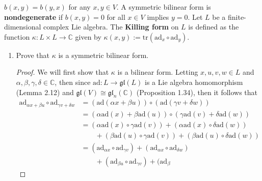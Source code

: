 \documentclass[12pt]{article}
\theoremstyle{definition}
\begin{document}
\begin{enumerate}
            $b(x, y)=b(y, x)$ for any $x, y\in V$. A symmetric bilinear form is
            \textbf{nondegenerate} if $b(x, y)=0$ for all $x\in V$ implies
            $y=0$. Let $L$ be a finite-dimensional complex Lie algebra. The
            \textbf{Killing form} on $L$ is defined as the function
            $\kappa:L\times L\to\mathbb{C}$ given by $\kappa(x,
            y):=\text{tr}(\text{ad}_x\circ\text{ad}_y)$.
            \begin{enumerate}[label=(\alph*)]
                \item Prove that $\kappa$ is a symmetric bilinear form.
                    \begin{proof}
                        We will first show that $\kappa$ is a bilinear form.
                        Letting $x, u, v, w\in L$ and $\alpha, \beta, \gamma,
                        \delta\in\mathbb{C}$, then since
                        $\text{ad}:L\to\mathfrak{gl}(L)$ is a Lie algebra
                        homomorphism (Lemma 2.12) and
                        $\mathfrak{gl}(V)\cong\mathfrak{gl}_n(\mathbb{C})$
                        (Proposition 1.34),
                        then it follows that
                        \begin{equation*}
                            \begin{split}
                                \text{ad}_{\alpha x+\beta
                                u}\circ\text{ad}_{\gamma v+\delta w}
                                &=(\text{ad}(\alpha x+\beta
                                u))\circ(\text{ad}(\gamma v+\delta w)) \\
                                &=(\alpha\text{ad}(x)+\beta\text{ad}(u))\circ(\gamma\text{ad}(v)+\delta\text{ad}(w))
                                \\
                                &=(\alpha\text{ad}(x)\circ\gamma\text{ad}(v))
                                +(\alpha\text{ad}(x)\circ\delta\text{ad}(w))\\&\quad\quad
                                +(\beta\text{ad}(u)\circ\gamma\text{ad}(v))
                                +(\beta\text{ad}(u)\circ\delta\text{ad}(w)) \\
                                &=(\text{ad}_{\alpha x}\circ\text{ad}_{\gamma
                                v})+(\text{ad}_{\alpha x}\circ\text{ad}_{\delta
                                w})\\&\quad\quad+(\text{ad}_{\beta
                                u}\circ\text{ad}_{\gamma v})+(\text{ad}_{\beta
}
\end{split}
\end{equation*}
\end{proof}
\end{enumerate}
\end{enumerate}
\end{document}

